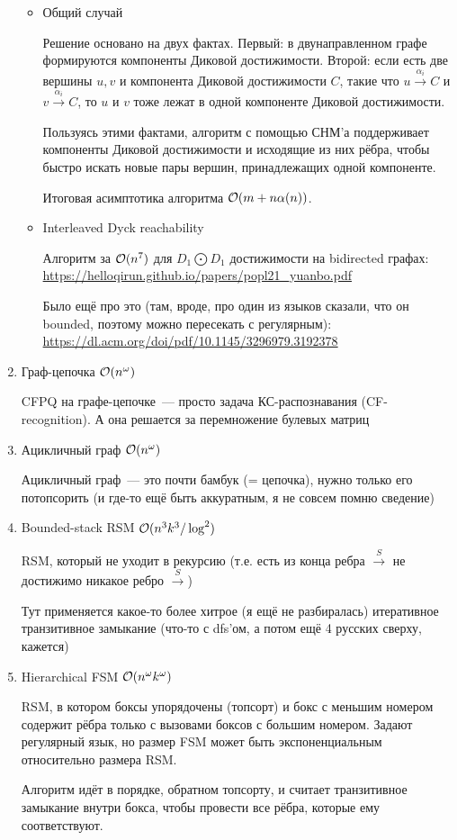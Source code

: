 \begin{enumerate}
\begin{itemize}
        \item Общий случай \cite{Chatterjee17}

        Решение основано на двух фактах. Первый: в двунаправленном графе формируются компоненты Диковой достижимости. Второй: если есть две вершины $u, v$ и компонента Диковой достижимости $C$, такие что $u \xrightarrow{\alpha_i} C$ и $v \xrightarrow{\alpha_i} C$, то $u$ и $v$ тоже лежат в одной компоненте Диковой достижимости. 

        Пользуясь этими фактами, алгоритм с помощью СНМ'а поддерживает компоненты Диковой достижимости и исходящие из них рёбра, чтобы быстро искать новые пары вершин, принадлежащих одной компоненте.

        Итоговая асимптотика алгоритма $\mathcal{O}(m + n \alpha(n))$.

        \item Interleaved Dyck reachability

        Алгоритм за $\mathcal{O}(n^7)$ для $D_1 \bigodot D_1$ достижимости на bidirected графах: 
        \url{https://helloqirun.github.io/papers/popl21_yuanbo.pdf}

        Было ещё про это (там, вроде, про один из языков сказали, что он bounded, поэтому можно пересекать с регулярным): 
        \url{https://dl.acm.org/doi/pdf/10.1145/3296979.3192378}
    \end{itemize}

    \item Граф-цепочка $\mathcal{O}(n^{\omega})$ \cite{Valiant1975}

        CFPQ на графе-цепочке~--- просто задача КС-распознавания (CF-recognition). А она решается за перемножение булевых матриц \cite{Valiant1975}

    \item Ацикличный граф $\mathcal{O}(n^{\omega})$ \cite{Yannakakis1990}

        Ацикличный граф~--- это почти бамбук (= цепочка), нужно только его потопсорить (и где-то ещё быть аккуратным, я не совсем помню сведение)

    \item Bounded-stack RSM $\mathcal{O}(n^3 k^3 / \log^2)$ \cite{Chaudhuri08}

        RSM, который не уходит в рекурсию (т.е. есть из конца ребра $\xrightarrow{S}$ не достижимо никакое ребро $\xrightarrow{S}$)

        Тут применяется какое-то более хитрое (я ещё не разбиралась) итеративное транзитивное замыкание (что-то с dfs'ом, а потом ещё 4 русских сверху, кажется)

    \item Hierarchical FSM $\mathcal{O}(n^{\omega} k^{\omega})$ \cite{Chaudhuri08}

        RSM, в котором боксы упорядочены (топсорт) и бокс с меньшим номером содержит рёбра только с вызовами боксов с большим номером. Задают регулярный язык, но размер FSM может быть экспоненциальным относительно размера RSM.

        Алгоритм идёт в порядке, обратном топсорту, и считает транзитивное замыкание внутри бокса, чтобы провести все рёбра, которые ему соответствуют.

\end{enumerate}

